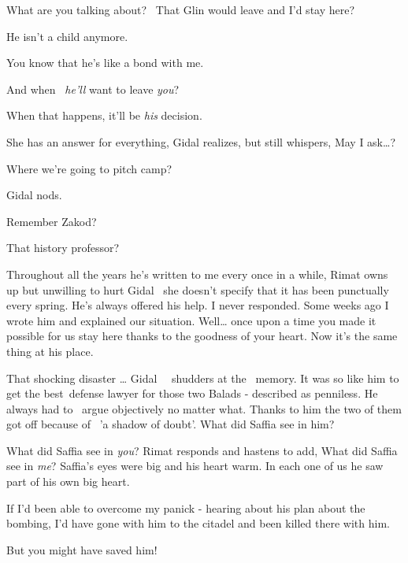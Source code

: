 \documentclass[letterpaper]{article}
\begin{document}
{\textquotedbl}What are you talking about? \ That Glin would leave and I'd stay here?{\textquotedbl} 

{\textquotedbl}He isn't a child anymore.{\textquotedbl} 

{\textquotedbl}You know that he's like a bond{ }with me.{\textquotedbl} 

{\textquotedbl}And when {\ }\textit{he'll} want to leave \textit{you}?{\textquotedbl} 

{\textquotedbl}When that happens, it'll be \textit{his} decision.{\textquotedbl} 

She has an answer for everything, Gidal realizes, but still whispers, {\textquotedbl}May I ask{\dots}?{\textquotedbl} 

{\textquotedbl}Where we're going to pitch camp?{\textquotedbl} 

Gidal nods. 

{\textquotedbl}Remember Zakod?{\textquotedbl} 

{\textquotedbl}That history professor?{\textquotedbl} 

{\textquotedbl}Throughout all the years he's written to me every once in a while,{\textquotedbl} Rimat owns up but
unwilling to hurt Gidal \ she doesn't specify that it has been{
}{punctually}{ }every spring. {\textquotedbl}He's always offered his help. I never
responded. Some weeks ago I wrote him and explained our situation. Well{\dots} once upon a time you made it possible
for us stay here thanks to{ }the goodness of your heart. Now it's the same thing at his
place.{\textquotedbl} 

{\textquotedbl}That shocking disaster {\dots}{\textquotedbl} Gidal{ \ \ }shudders at the
{\ }memory. {\textquotedbl}It was so like him to get the best~defense lawyer for those two Balads -
described as penniless. He always had to \ argue objectively no matter what. Thanks to him the two of them got off
because of \ {}'a shadow of doubt'. What did Saffia see in him?{\textquotedbl} 

{\textquotedbl}What did Saffia see in \textit{you}?{\textquotedbl} Rimat responds and hastens to add,
{\textquotedbl}What did Saffia see in \textit{me}? Saffia's eyes were big and his heart warm. In each one of us he saw
part of his own{ big heart}.

{\textquotedbl}If I'd been able to overcome my panick - hearing about his plan about the bombing, I'd have gone with him
to the citadel and been killed there with him.{\textquotedbl} 

{\textquotedbl}But you might have saved him!{\textquotedbl} 
\end{document}

